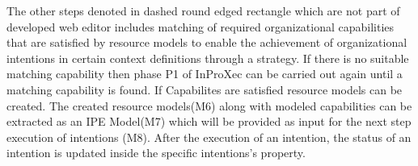The other steps denoted in dashed round edged rectangle which are not part of developed web editor includes matching of required organizational capabilities that are satisfied by resource models  to enable the achievement of organizational intentions in certain context definitions through a strategy. If there is no suitable matching capability then phase P1 of InProXec can be carried out again until a matching capability is found. If Capabilites are satisfied resource models can be created. The created resource models(M6) along with modeled capabilities can be extracted as an IPE Model(M7) which will be provided as input for the next step execution of intentions (M8). After the execution of an intention, the status of an intention is updated inside the specific intentions's property. 










